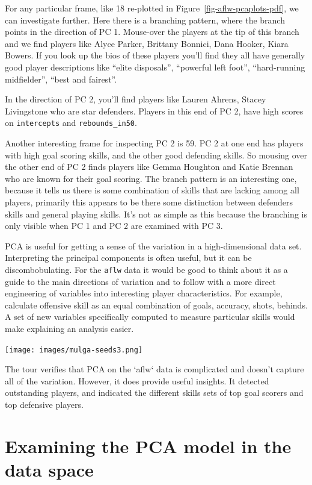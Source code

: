 \documentclass[
  letterpaper,
]{krantz}
\newcommand{\insightbox}[1]{%
\noindent\colorbox{insight!30}{%
\begin{minipage}{0.98\textwidth}%
    \centering%
    \begin{minipage}[c]{0.15\textwidth} %
      \texttt{[image: images/mulga-seeds3.png]} %
    \end{minipage}%
    \hfill %
    \begin{minipage}[c]{0.8\textwidth} %
      \bigskip%
      \textsf{#1}%
      \bigskip%
    \end{minipage}%
    \hspace*{3mm}%
  \end{minipage}%
}%
}
\begin{document}
For any particular frame, like 18 re-plotted in
Figure~\ref{fig-aflw-pcaplots-pdf}, we can investigate further. Here
there is a branching pattern, where the branch points in the direction
of PC 1. Mouse-over the players at the tip of this branch and we find
players like Alyce Parker, Brittany Bonnici, Dana Hooker, Kiara Bowers.
If you look up the bios of these players you'll find they all have
generally good player descriptions like ``elite disposals'', ``powerful
left foot'', ``hard-running midfielder'', ``best and fairest''.

In the direction of PC 2, you'll find players like Lauren Ahrens, Stacey
Livingstone who are star defenders. Players in this end of PC 2, have
high scores on \texttt{intercepts} and \texttt{rebounds\_in50}.

Another interesting frame for inspecting PC 2 is 59. PC 2 at one end has
players with high goal scoring skills, and the other good defending
skills. So mousing over the other end of PC 2 finds players like Gemma
Houghton and Katie Brennan who are known for their goal scoring. The
branch pattern is an interesting one, because it tells us there is some
combination of skills that are lacking among all players, primarily this
appears to be there some distinction between defenders skills and
general playing skills. It's not as simple as this because the branching
is only visible when PC 1 and PC 2 are examined with PC 3.

PCA is useful for getting a sense of the variation in a high-dimensional
data set. Interpreting the principal components is often useful, but it
can be discombobulating. For the \texttt{aflw} data it would be good to
think about it as a guide to the main directions of variation and to
follow with a more direct engineering of variables into interesting
player characteristics. For example, calculate offensive skill as an
equal combination of goals, accuracy, shots, behinds. A set of new
variables specifically computed to measure particular skills would make
explaining an analysis easier.

\insightbox{The tour verifies that PCA on the `aflw` data is complicated and doesn't capture all of the variation. However, it does provide useful insights. It detected outstanding players, and indicated the different skills sets of top goal scorers and top defensive players.}

\section{Examining the PCA model in the data
space}\label{examining-the-pca-model-in-the-data-space}
\end{document}
